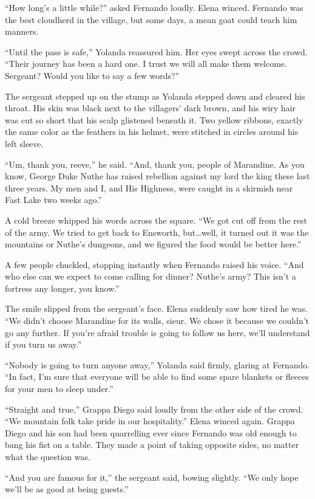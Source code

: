 \documentclass[10pt]{book}
\begin{document}
``How long's a little while?'' asked Fernando loudly. Elena winced. Fernando was the best cloudherd in the village, but some days, a mean goat could teach him manners.

``Until the pass is safe,'' Yolanda reassured him. Her eyes swept across the crowd. ``Their journey has been a hard one. I trust we will all make them welcome. Sergeant? Would you like to say a few words?''

The sergeant stepped up on the stump as Yolanda stepped down and cleared his throat. His skin was black next to the villagers' dark brown, and his wiry hair was cut so short that his scalp glistened beneath it. Two yellow ribbons, exactly the same color as the feathers in his helmet, were stitched in circles around his left sleeve.

``Um, thank you, reeve,'' he said. ``And, thank you, people of Marandine. As you know, George Duke Nuthe has raised rebellion against my lord the king these last three years. My men and I, and His Highness, were caught in a skirmish near Fast Lake two weeks ago.''

A cold breeze whipped his words across the square. ``We got cut off from the rest of the army. We tried to get back to Ensworth, but{\ldots}well, it turned out it was the mountains or Nuthe's dungeons, and we figured the food would be better here.''

A few people chuckled, stopping instantly when Fernando raised his voice. ``And who else can we expect to come calling for dinner? Nuthe's army? This isn't a fortress any longer, you know.''

The smile slipped from the sergeant's face. Elena suddenly saw how tired he was. ``We didn't choose Marandine for its walls, sieur. We chose it because we couldn't go any further. If you're afraid trouble is going to follow us here, we'll understand if you turn us away.''

``Nobody is going to turn anyone away,'' Yolanda said firmly, glaring at Fernando. ``In fact, I'm sure that everyone will be able to find some spare blankets or fleeces for your men to sleep under.''

``Straight and true,'' Grappa Diego said loudly from the other side of the crowd. ``We mountain folk take pride in our hospitality.'' Elena winced again. Grappa Diego and his son had been quarrelling ever since Fernando was old enough to bang his fist on a table. They made a point of taking opposite sides, no matter what the question was.

``And you are famous for it,'' the sergeant said, bowing slightly. ``We only hope we'll be as good at being guests.''
\end{document}
